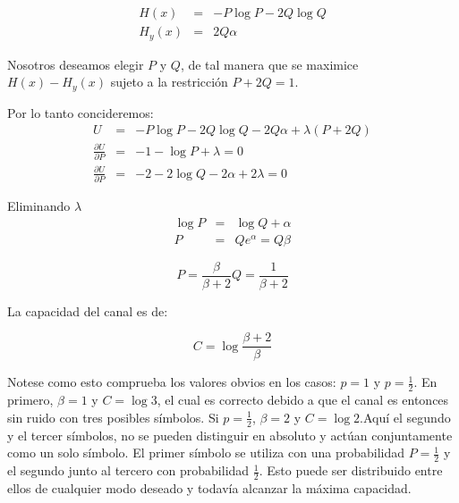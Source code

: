 \begin{equation}
\begin{array}{rcl}
H(x) &=& -P\log{P} - 2Q\log{Q} \\
H_y(x) &=& 2Q\alpha
\end{array}
\end{equation}

Nosotros deseamos elegir $P$ y $Q$, de tal manera que se maximice
$H(x) - H_y(x)$ sujeto a la restricci\'on $P + 2Q = 1$.

Por lo tanto concideremos:
\begin{equation}
\begin{array}{rcl}
U &=& -P\log{P} - 2Q\log{Q} -2Q\alpha + \lambda(P+2Q) \\
\frac{{\partial U}}{{\partial P}} &=& -1 - \log{P} + \lambda = 0 \\
\frac{{\partial U}}{{\partial P}} &=& -2 - 2\log{Q} -2\alpha + 2\lambda = 0
\end{array}
\end{equation}

Eliminando $\lambda$
\begin{equation}
\begin{array}{rcl}
\log{P} &=& \log{Q} + \alpha \\
P &=& Q e^\alpha = Q\beta 
\end{array}
\end{equation}

\begin{equation}
  P = \frac{\beta}{\beta + 2}   Q = \frac{1}{\beta + 2}
\end{equation}

La capacidad del canal es de:

\begin{equation}
  C = \log{\frac{\beta + 2}{\beta}}
\end{equation}

Notese como esto comprueba los valores obvios en los casos: $p = 1$ y $p = \frac{1}{2}$. En primero, $\beta = 1$ y $C = \log{3}$, 
el cual es correcto debido a que el canal es entonces sin ruido con tres posibles s\'imbolos. Si $p = \frac{1}{2}$, $\beta = 2$ y 
$C = \log{2}$.Aqu\'i el segundo y el tercer s\'imbolos, no se pueden distinguir en absoluto y act\'uan conjuntamente como un solo 
s\'imbolo. El primer s\'imbolo se utiliza con una probabilidad $P = \frac{1}{2}$  y el segundo junto al tercero con probabilidad $\frac{1}{2}$.
Esto puede ser distribuido entre ellos de cualquier modo deseado y todav\'ia alcanzar la m\'axima capacidad.

